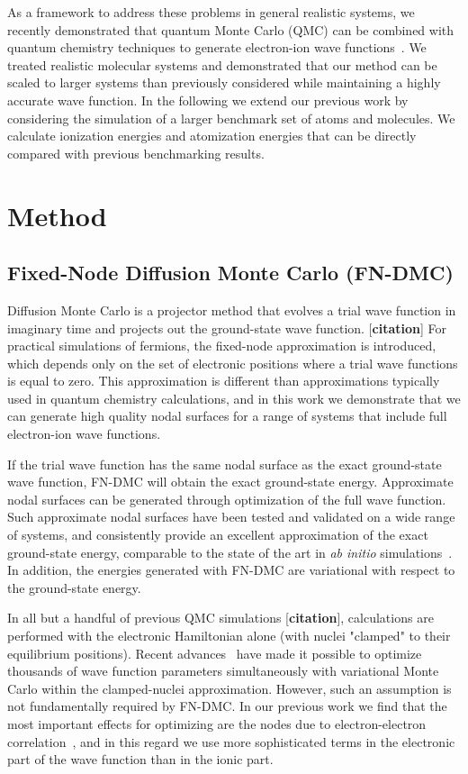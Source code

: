 \documentclass[pra,superscriptaddress,groupedaddress,twocolumn]{revtex4}
\begin{document}
As a framework to address these problems in general realistic systems, we recently demonstrated that quantum Monte Carlo (QMC) can be combined with quantum chemistry techniques to generate electron-ion wave functions~\cite{Tubman_ECG}. We treated realistic molecular systems and demonstrated that our method can be scaled to larger systems than previously considered while maintaining a highly accurate wave function. In the following we extend our previous work by considering the simulation of a larger benchmark set of atoms and molecules.  We calculate ionization energies and atomization energies that can be directly compared with previous benchmarking results. 

\section{Method}
\subsection{Fixed-Node Diffusion Monte Carlo (FN-DMC)}
Diffusion Monte Carlo is a projector method that evolves a trial wave function in imaginary time and projects out the ground-state wave function. [\textbf{citation}] For practical simulations of fermions, the fixed-node approximation is introduced, which depends only on the set of electronic positions where a trial wave functions is equal to zero.  This approximation is different than approximations typically used in quantum chemistry calculations, and in this work we demonstrate that we can generate high quality nodal surfaces for a range of systems that include full electron-ion wave functions. 

If the trial wave function has the same nodal surface as the exact ground-state wave function, FN-DMC will obtain the exact ground-state energy.  Approximate nodal surfaces can be generated through optimization of the full wave function. Such approximate nodal surfaces have been tested and validated on a wide range of systems, and consistently provide an excellent approximation of the exact ground-state energy,  comparable to the state of the art in \textit{ab initio} simulations~\cite{grossman1}. In addition, the energies generated with FN-DMC are variational with respect to the ground-state energy.

In all but a handful of previous QMC simulations [\textbf{citation}], calculations are performed with the electronic Hamiltonian alone (with nuclei "clamped" to their equilibrium positions). Recent advances~\cite{Nightingale_Linear,Umrigar_Linear,Brown_Bench} have made it possible to optimize thousands of wave function parameters simultaneously with variational Monte Carlo within the clamped-nuclei approximation. However, such an assumption is not fundamentally required by FN-DMC. In our previous work we find that the most important effects for optimizing are the nodes due to electron-electron correlation~\cite{Tubman_ECG}, and in this regard we use more sophisticated terms in the electronic part of the wave function than in the ionic part.
\end{document}
